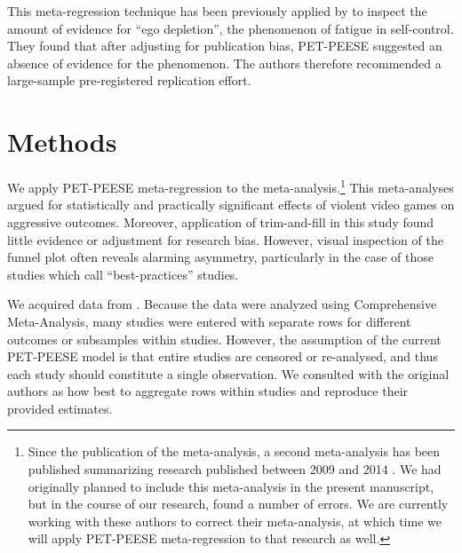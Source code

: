 \documentclass[man]{apa6}
\begin{document}
This meta-regression technique has been previously applied by \citet{Carter:McCullough:2014} to inspect the amount of evidence for ``ego depletion'', the phenomenon of fatigue in self-control. They found that after adjusting for publication bias, PET-PEESE suggested an absence of evidence for the phenomenon. The authors therefore recommended a large-sample pre-registered replication effort.

\section{Methods}
We apply PET-PEESE meta-regression to the \citet{Anderson:etal:2010} meta-analysis.\footnote{Since the publication of the \citet{Anderson:etal:2010} meta-analysis, a second meta-analysis has been published summarizing research published between 2009 and 2014 \citet{Greitemeyer:Mugge:2014}. We had originally planned to include this meta-analysis in the present manuscript, but in the course of our research, found a number of errors. We are currently working with these authors to correct their meta-analysis, at which time we will apply PET-PEESE meta-regression to that research as well.} This meta-analyses argued for statistically and practically significant effects of violent video games on aggressive outcomes. Moreover, application of trim-and-fill in this study found little evidence or adjustment for research bias. 
However, visual inspection of the funnel plot often reveals alarming asymmetry, particularly in the case of those studies which \citet{Anderson:etal:2010} call ``best-practices'' studies.

We acquired data from \citet{Anderson:etal:2010}. Because the data were analyzed using Comprehensive Meta-Analysis, many studies were entered with separate rows for different outcomes or subsamples within studies. However, the assumption of the current PET-PEESE model is that entire studies are censored or re-analysed, and thus each study should constitute a single observation. We consulted with the original authors as how best to aggregate rows within studies and reproduce their provided estimates.
\end{document}
